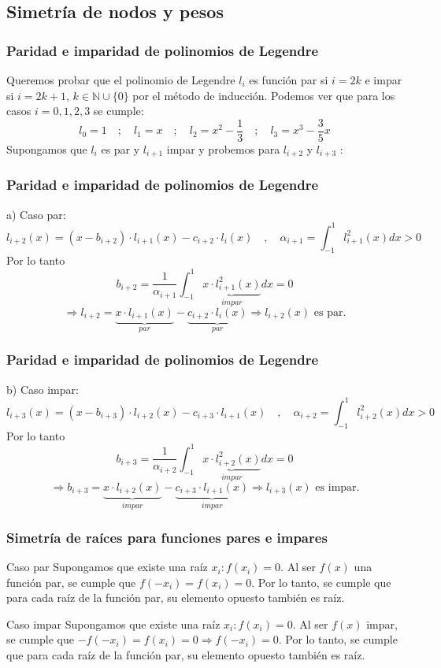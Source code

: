 \documentclass{beamer}
\begin{document}
\subsection{Simetría de nodos y pesos}
\begin{frame}
\frametitle{Paridad e imparidad de polinomios de Legendre}
Queremos probar que el polinomio de Legendre $l_i$ es función par si $i=2k$ e impar si $i=2k+1$, $k\in\mathbb{N}\cup\{0\}$ por el método de inducción. Podemos ver que para los casos $i=0, 1, 2, 3$ se cumple:
\[l_0=1\quad;\quad l_1=x\quad;\quad l_2=x^2-\frac{1}{3}\quad;\quad l_3=x^3-\frac{3}{5}x \]
Supongamos que $l_i$ es par y $l_{i+1}$ impar y probemos para $l_{i+2}$ y $l_{i+3}$ :
\end{frame}
\begin{frame}
\frametitle{Paridad e imparidad de polinomios de Legendre}
a) Caso par:
\[l_{i+2}(x)=(x-b_{i+2})\cdot l_{i+1}(x)-c_{i+2}\cdot l_i(x)\quad, \quad\alpha_{i+1}=\int_{-1}^1l_{i+1}^2(x)dx>0\]
Por lo tanto \[b_{i+2}=\frac{1}{\alpha_{i+1}} \int_{-1}^1\underbrace{x\cdot l_{i+1}^2(x)}_{impar}dx=0\]
\[\Rightarrow l_{i+2}=\underbrace{x\cdot l_{i+1}(x)}_{par}-\underbrace{c_{i+2}\cdot l_i(x)}_{par}\Rightarrow l_{i+2}(x)\text{ es par.} \]
\end{frame}
\begin{frame}
\frametitle{Paridad e imparidad de polinomios de Legendre}
b) Caso impar:
\[l_{i+3}(x)=(x-b_{i+3})\cdot l_{i+2}(x)-c_{i+3}\cdot l_{i+1}(x)\quad,\quad\alpha_{i+2}=\int_{-1}^1l_{i+2}^2(x)dx>0\] 
Por lo tanto \[b_{i+3}=\frac{1}{\alpha_{i+2}}\int_{-1}^1\underbrace{x\cdot l_{i+2}^2(x)}_{impar}dx=0\]
\[\Rightarrow b_{i+3}=\underbrace{x\cdot l_{i+2}(x)}_{impar}-\underbrace{c_{i+3}\cdot l_{i+1}(x)}_{impar}\Rightarrow l_{i+3}(x)\text{ es impar.}\]
\end{frame}

\begin{frame} 
\frametitle{Simetría de raíces para funciones pares e impares}
\begin{block}{Caso par} 
Supongamos que existe una raíz $x_i:f(x_i)=0$. Al ser $f(x)$ una función par, se cumple que $f(-x_i)=f(x_i)=0$. Por lo tanto, se cumple que para cada raíz de la función par, su elemento opuesto también es raíz.
\end{block}
\begin{block}{Caso impar} 
Supongamos que existe una raíz $x_i:f(x_i)=0$. Al ser $f(x)$ impar, se cumple que $-f(-x_i)=f(x_i)=0\Rightarrow f(-x_i)=0$. Por lo tanto, se cumple que para cada raíz de la función par, su elemento opuesto también es raíz.
\end{block}
\end{frame}
\end{document}
